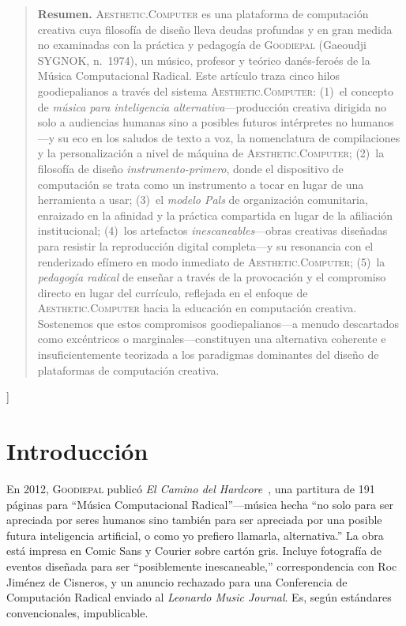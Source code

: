 \documentclass[10pt,letterpaper,twocolumn]{article}
\newcommand{\ac}{\textsc{Aesthetic.Computer}}
\newcommand{\gp}{\textsc{Goodiepal}}
\begin{document}
{\begin{quote}
\small\noindent\textbf{Resumen.}
\ac{} es una plataforma de computación creativa cuya filosofía de diseño lleva deudas profundas y en gran medida no examinadas con la práctica y pedagogía de \gp{} (Gaeoudji SYGNOK, n.~1974), un músico, profesor y teórico danés-feroés de la Música Computacional Radical. Este artículo traza cinco hilos goodiepalianos a través del sistema \ac{}: (1)~el concepto de \emph{música para inteligencia alternativa}---producción creativa dirigida no solo a audiencias humanas sino a posibles futuros intérpretes no humanos---y su eco en los saludos de texto a voz, la nomenclatura de compilaciones y la personalización a nivel de máquina de \ac{}; (2)~la filosofía de diseño \emph{instrumento-primero}, donde el dispositivo de computación se trata como un instrumento a tocar en lugar de una herramienta a usar; (3)~el \emph{modelo Pals} de organización comunitaria, enraizado en la afinidad y la práctica compartida en lugar de la afiliación institucional; (4)~los artefactos \emph{inescaneables}---obras creativas diseñadas para resistir la reproducción digital completa---y su resonancia con el renderizado efímero en modo inmediato de \ac{}; (5)~la \emph{pedagogía radical} de enseñar a través de la provocación y el compromiso directo en lugar del currículo, reflejada en el enfoque de \ac{} hacia la educación en computación creativa. Sostenemos que estos compromisos goodiepalianos---a menudo descartados como excéntricos o marginales---constituyen una alternativa coherente e insuficientemente teorizada a los paradigmas dominantes del diseño de plataformas de computación creativa.
\end{quote}
\vspace{0.5em}
}]

\section{Introducción}

En 2012, \gp{} publicó \emph{El Camino del Hardcore}~\citep{goodiepal2012elcamino}, una partitura de 191 páginas para ``Música Computacional Radical''---música hecha ``no solo para ser apreciada por seres humanos sino también para ser apreciada por una posible futura inteligencia artificial, o como yo prefiero llamarla, alternativa.'' La obra está impresa en Comic Sans y Courier sobre cartón gris. Incluye fotografía de eventos diseñada para ser ``posiblemente inescaneable,'' correspondencia con Roc Jim\'enez de Cisneros, y un anuncio rechazado para una Conferencia de Computación Radical enviado al \emph{Leonardo Music Journal}. Es, según estándares convencionales, impublicable.
\end{document}
